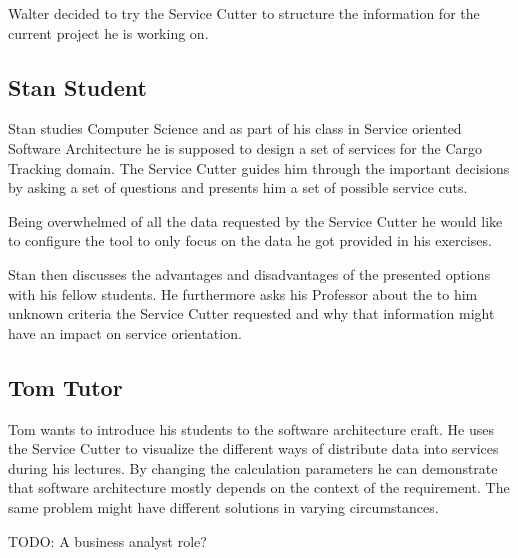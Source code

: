 Walter decided to try the Service Cutter to structure the information for the current project he is working on.



\subsection{Stan Student}

Stan studies Computer Science and as part of his class in Service oriented Software Architecture he is supposed to design a set of services for the Cargo Tracking\cite{dddGithub} domain. The Service Cutter guides him through the important decisions by asking a set of questions and presents him a set of possible service cuts. 

Being overwhelmed of all the data requested by the Service Cutter he would like to configure the tool to only focus on the data he got provided in his exercises. 

Stan then discusses the advantages and disadvantages of the presented options with his fellow students. He furthermore asks his Professor about the to him unknown criteria the Service Cutter requested and why that information might have an impact on service orientation. 


\subsection{Tom Tutor}

Tom wants to introduce his students to the software architecture craft. He uses the Service Cutter to visualize the different ways of distribute data into services during his lectures. By changing the calculation parameters he can demonstrate that software architecture mostly depends on the context of the requirement. The same problem might have different solutions in varying circumstances.

TODO: A business analyst role?
